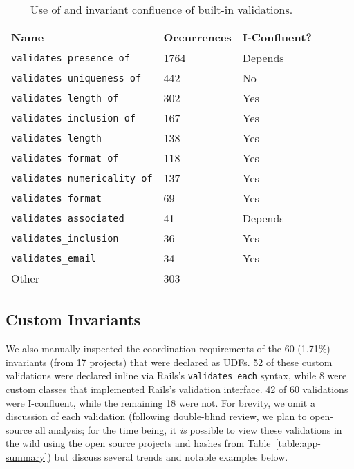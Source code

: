 \begin{table}
\begin{center}
\small
\begin{tabular}{|l l l |}
\hline
Name & Occurrences & I-Confluent?\\\hline
\texttt{validates\_presence\_of} & 1764 & Depends\\
\texttt{validates\_uniqueness\_of} & 442 & No \\
\texttt{validates\_length\_of} & 302 & Yes \\
\texttt{validates\_inclusion\_of} & 167 & Yes\\
\texttt{validates\_length} & 138 & Yes \\
\texttt{validates\_format\_of} & 118 & Yes\\
\texttt{validates\_numericality\_of} & 137 & Yes \\
\texttt{validates\_format} & 69 & Yes \\
\texttt{validates\_associated} & 41 & Depends\\
\texttt{validates\_inclusion} & 36 & Yes \\
\texttt{validates\_email} & 34 & Yes \\
Other & 303 & \\\hline
\end{tabular}
\end{center}\vspace{-1em}
\caption{Use of and invariant confluence of built-in validations.}
\label{table:builtins}
\end{table}

\subsection{Custom Invariants}

We also manually inspected the coordination requirements of the 60
(1.71\%) invariants (from 17 projects) that were declared as UDFs. 52
of these custom validations were declared inline via Rails's
\texttt{validates\_each} syntax, while 8 were custom classes that
implemented Rails's validation interface. 42 of 60 validations were
I-confluent, while the remaining 18 were not. For brevity, we omit a
discussion of each validation (following double-blind review, we plan
to open-source all analysis; for the time being, it \textit{is}
possible to view these validations in the wild using the open source
projects and hashes from Table~\ref{table:app-summary}) but discuss
several trends and notable examples below.

